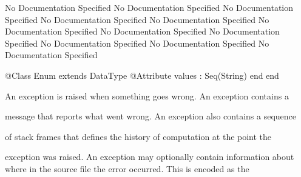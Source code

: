 No Documentation Specified
No Documentation Specified
No Documentation Specified
No Documentation Specified
No Documentation Specified
No Documentation Specified
No Documentation Specified
No Documentation Specified
No Documentation Specified
No Documentation Specified
No Documentation Specified
\begin{Interface}
@Class Enum extends DataType
  @Attribute values : Seq(String) end
end
\end{Interface}

      An exception is raised when something goes wrong. An exception contains a

      message that reports what went wrong. An exception also contains a sequence

      of stack frames that defines the history of computation at the point the

      exception was raised. An exception may optionally contain information 
      about where in the source file the error occurred. This is encoded as the

